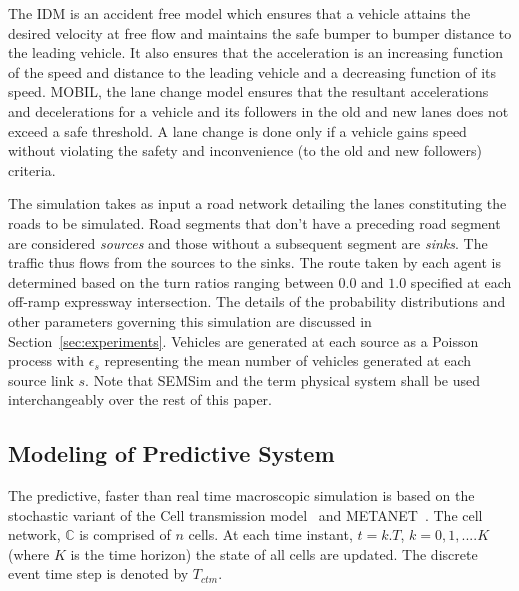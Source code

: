 \documentclass{wscpaperproc}
\theoremstyle{wsc}
\begin{document}
The IDM is an accident free model which ensures that a vehicle attains the desired velocity at free flow and maintains the safe bumper to bumper distance to the leading vehicle. It also ensures that the acceleration is an increasing function of the speed and distance to the leading vehicle and a decreasing function of its speed. MOBIL, the lane change model ensures that the resultant accelerations and decelerations for a vehicle and its followers in the old and new lanes does not exceed a safe threshold. A lane change is done only if a vehicle gains speed without violating the safety and inconvenience (to the old and new followers) criteria.


The simulation takes as input a road network detailing the lanes constituting the roads to be simulated. Road segments that don't have a preceding road segment are considered {\it sources} and those without a subsequent segment are {\it sinks}. The traffic thus flows from the sources to the sinks. The route taken by each agent is determined  based on the turn ratios  ranging between $0.0$ and $1.0$ specified at each off-ramp expressway intersection. The details of the probability distributions and other parameters governing this simulation are discussed in Section~\ref{sec:experiments}. Vehicles are generated at each source as a Poisson process with $\epsilon_{s}$ representing the mean number of vehicles generated at each source link $s$. Note that SEMSim and the term physical system shall be used interchangeably over the rest of this paper.


\subsection{Modeling of Predictive System}

The predictive, faster than real time macroscopic simulation is based on the stochastic variant of the Cell transmission model~ and METANET~. The cell network, $\mathbb{C}$ is comprised of $n$ cells. At each time instant, $t=k.T$, $k=0,1, .... K$ (where $K$ is the time horizon) the state of all cells are updated. The discrete event time step is denoted by $T_{ctm}$.
  
\end{document}

